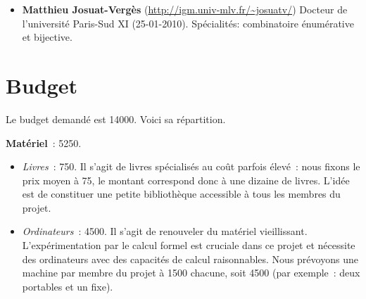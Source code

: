 \documentclass[10pt,reqno]{amsart}
\numberwithin{equation}{subsection}
\begin{document}
\begin{itemize}[fullwidth]
\item {\bf Matthieu Josuat-Vergès} (\url{http://igm.univ-mlv.fr/~josuatv/})
Docteur de l'université Paris-Sud XI (25-01-2010). 
Spécialités: combinatoire énumérative et bijective. 
% 


\end{itemize}

\section{Budget}
Le budget demandé est 14000\texteuro. Voici sa répartition.
\smallskip

{\bf Matériel}~: 5250\texteuro.
\begin{itemize}[fullwidth]
    \item {\em Livres}~: 750\texteuro.
    Il s'agit de livres spécialisés au coût parfois élevé~: nous
    fixons le prix moyen à 75\texteuro, le montant correspond donc
    à une dizaine de livres. L'idée est de constituer une petite
    \og bibliothèque \fg{} accessible à tous les membres du projet.

    \item {\em Ordinateurs}~: 4500\texteuro.
    Il s'agit de renouveler du matériel vieillissant.
    L'expérimentation par le calcul formel est cruciale dans ce
    projet et nécessite des ordinateurs avec des capacités de calcul
    raisonnables. Nous prévoyons une machine par membre du projet à
    1500\texteuro{} chacune, soit 4500\texteuro{} (par exemple~:
    deux portables et un fixe).

\end{itemize}
\smallskip
    
\end{document}
